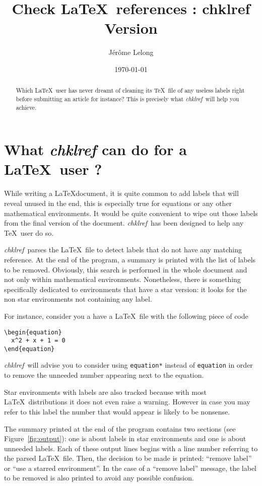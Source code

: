 \documentclass[a4paper,11pt,twoside]{article}
\title{Check \LaTeX\ references : chklref \\
Version \chkVERSION}
\date{\today}
\author{Jérôme Lelong}
\def\chk{{\it chklref}}
\begin{document}
\maketitle

\begin{abstract} Which \LaTeX\ user has never dreamt of cleaning its \TeX\ file
  of any useless labels right before submitting an article for instance? This is
  precisely what \chk\ will help you achieve.
\end{abstract}

\section{What {\it chklref} can do for a \LaTeX\ user ?}

While writing a \LaTeX document, it is quite common to add labels that will 
reveal unused in the end, this is especially true for equations or any other
mathematical environments. It would be quite convenient to wipe out those labels
from the final version of the document. \chk\ has been designed to help any
\TeX\ user do so.

\chk\ parses the \LaTeX\ file to detect labels that do not have any matching
reference. At the end of the program, a summary is printed with the list of
labels to be removed. Obviously, this search is performed in the whole document
and not only within mathematical environments. Nonetheless, there is something
specifically dedicated to environments that have a star version: it looks
for the non star environments not containing any label.

For instance, consider you a have a \LaTeX\ file with the following piece of code
\begin{verbatim}
\begin{equation}
  x^2 + x + 1 = 0
\end{equation}
\end{verbatim}
\chk\ will advise you to consider using \verb!equation*! instead of
\verb!equation! in order to remove the unneeded number appearing next to the
equation.

Star environments with labels are also tracked because with most \LaTeX\
distributions it does not even raise a warning. However in case you may refer to
this label the number that would appear is likely to be nonsense.

The summary printed at the end of the program contains two sections (see
Figure~\ref{fig:output}): one is about labels in star environments and one is about
unneeded labels. Each of these output lines begins with a line number referring
to the parsed \LaTeX\ file. Then, the decision to be made is printed:
``remove label'' or ``use a starred environment''. In the case of a ``remove
label'' message, the label to be removed is also printed to avoid any possible
confusion.
\end{document}
